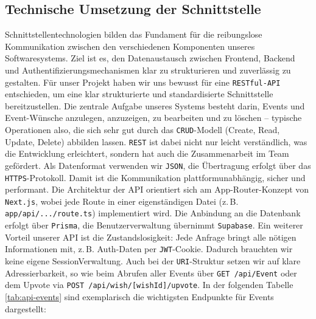 \documentclass[a4paper,12pt]{article}
\begin{document}
\subsection{Technische Umsetzung der Schnittstelle}
Schnitt\-stellen\-technologien bilden das Fundament für die reibungslose Kommunikation zwischen den verschiedenen Komponenten unseres Software\-systems. Ziel ist es, den Daten\-austausch zwischen Frontend, Backend und Authentifizierungs\-mechanismen klar zu strukturieren und zuverlässig zu gestalten. Für unser Projekt haben wir uns bewusst für eine \texttt{RESTful-API} entschieden, um eine klar strukturierte und standardisierte Schnittstelle bereitzustellen. Die zentrale Aufgabe unseres Systems besteht darin, Events und Event-Wünsche anzulegen, anzuzeigen, zu bearbeiten und zu löschen – typische Operationen also, die sich sehr gut durch das \texttt{\gls{CRUD}}-Modell (Create, Read, Update, Delete) abbilden lassen. \texttt{\gls{REST}} ist dabei nicht nur leicht verständlich, was die Entwicklung erleichtert, sondern hat auch die Zusammenarbeit im Team gefördert. Als Datenformat verwenden wir \texttt{JSON}, die Übertragung erfolgt über das \texttt{HTTPS}-Protokoll. Damit ist die Kommunikation platt\-form\-unabhängig, sicher und performant. Die Architektur der API orientiert sich am App-Router-Konzept von \mbox{\texttt{Next.js}}, wobei jede Route in einer eigenständigen Datei (z.\,B. \mbox{\texttt{app/api/.../route.ts}}) implementiert wird. Die Anbindung an die Datenbank erfolgt über \texttt{\gls{Prisma}}, die Benutzer\-verwaltung übernimmt \texttt{Supabase}. Ein weiterer Vorteil unserer \gls{API} ist die Zustands\-losigkeit: Jede Anfrage bringt alle nötigen Informationen mit, z.\,B. Auth-Daten per \texttt{\gls{JWT}}-Cookie. Dadurch brauchten wir keine eigene Session\-Verwaltung. Auch bei der \texttt{URI}-Struktur setzen wir auf klare Adressierbarkeit, so wie beim Abrufen aller Events über \mbox{\texttt{GET /api/Event}} oder dem Upvote via \mbox{\texttt{POST /api/wish/[wishId]/upvote}}. In der folgenden Tabelle \ref{tab:api-events} sind exemplarisch die wichtigsten Endpunkte für Events dargestellt:
\end{document}
